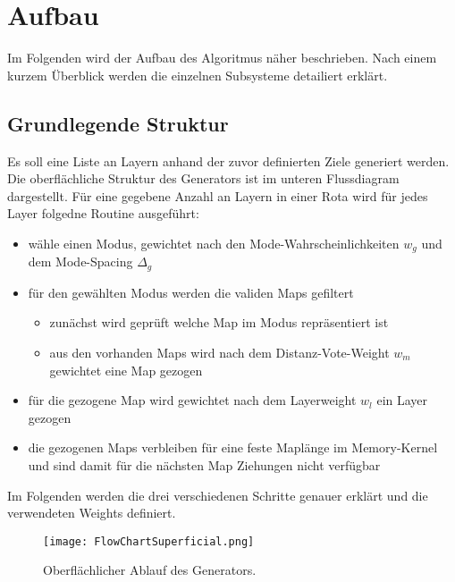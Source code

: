 \section{Aufbau}
    Im Folgenden wird der Aufbau des Algoritmus näher beschrieben. 
    Nach einem kurzem Überblick werden die einzelnen Subsysteme detailiert erklärt.
    \subsection{Grundlegende Struktur}
    Es soll eine Liste an Layern anhand der zuvor definierten Ziele generiert werden.
    Die oberflächliche Struktur des Generators ist im unteren Flussdiagram dargestellt. 
    Für eine gegebene Anzahl an Layern in einer Rota wird für jedes Layer folgedne Routine ausgeführt:
    \begin{itemize}
        \item wähle einen Modus, gewichtet nach den Mode-Wahrscheinlichkeiten $w_g$ und dem Mode-Spacing $\Delta_g$
        \item für den gewählten Modus werden die validen Maps gefiltert
        \begin{itemize}
            \item zunächst wird geprüft welche Map im Modus repräsentiert ist
            \item aus den vorhanden Maps wird nach dem Distanz-Vote-Weight $w_m$ gewichtet eine Map gezogen
        \end{itemize}
        \item für die gezogene Map wird gewichtet nach dem Layerweight $w_l$ ein Layer gezogen
        \item die gezogenen Maps verbleiben für eine feste Maplänge im Memory-Kernel und sind damit für die nächsten Map Ziehungen nicht verfügbar
    \end{itemize}
    Im Folgenden werden die drei verschiedenen Schritte genauer erklärt und die verwendeten Weights definiert. 
    \begin{figure}[htbp]
        \centering
        \texttt{[image: FlowChartSuperficial.png]}
        \caption{Oberflächlicher Ablauf des Generators.}
    \end{figure}

